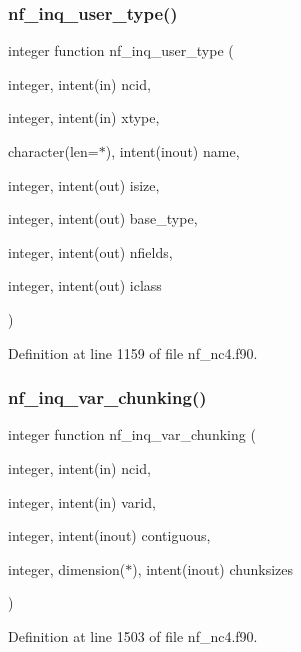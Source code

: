 \subsubsection{\texorpdfstring{nf\+\_\+inq\+\_\+user\+\_\+type()}{nf\_inq\_user\_type()}}
{\footnotesize\ttfamily integer function nf\+\_\+inq\+\_\+user\+\_\+type (\begin{DoxyParamCaption}\item[{integer, intent(in)}]{ncid,  }\item[{integer, intent(in)}]{xtype,  }\item[{character(len=$\ast$), intent(inout)}]{name,  }\item[{integer, intent(out)}]{isize,  }\item[{integer, intent(out)}]{base\+\_\+type,  }\item[{integer, intent(out)}]{nfields,  }\item[{integer, intent(out)}]{iclass }\end{DoxyParamCaption})}



Definition at line 1159 of file nf\+\_\+nc4.\+f90.

\mbox{\label{nf__nc4_8f90_acd11410bbe5e09c4154ddd649c3e712c}} 
\subsubsection{\texorpdfstring{nf\+\_\+inq\+\_\+var\+\_\+chunking()}{nf\_inq\_var\_chunking()}}
{\footnotesize\ttfamily integer function nf\+\_\+inq\+\_\+var\+\_\+chunking (\begin{DoxyParamCaption}\item[{integer, intent(in)}]{ncid,  }\item[{integer, intent(in)}]{varid,  }\item[{integer, intent(inout)}]{contiguous,  }\item[{integer, dimension($\ast$), intent(inout)}]{chunksizes }\end{DoxyParamCaption})}



Definition at line 1503 of file nf\+\_\+nc4.\+f90.

\mbox{\label{nf__nc4_8f90_aa85464177c4a586ebb4e25b1ca943746}} 
